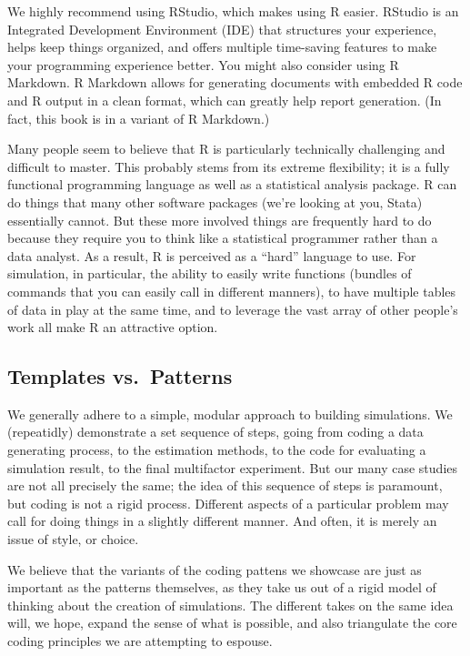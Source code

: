 \documentclass[
]{book}
\begin{document}
We highly recommend using RStudio, which makes using R easier. RStudio is an Integrated Development Environment (IDE) that structures your experience, helps keep things organized, and offers multiple time-saving features to make your programming experience better. You might also consider using R Markdown. R Markdown allows for generating documents with embedded R code and R output in a clean format, which can greatly help report generation.
(In fact, this book is in a variant of R Markdown.)

Many people seem to believe that R is particularly technically challenging and difficult to master. This probably stems from its extreme flexibility; it is a fully functional programming language as well as a statistical analysis package. R can do things that many other software packages (we're looking at you, Stata) essentially cannot.
But these more involved things are frequently hard to do because they require you to think like a statistical programmer rather than a data analyst.
As a result, R is perceived as a ``hard'' language to use.
For simulation, in particular, the ability to easily write functions (bundles of commands that you can easily call in different manners), to have multiple tables of data in play at the same time, and to leverage the vast array of other people's work all make R an attractive option.

\hypertarget{templates-vs.-patterns}{%
\subsection{Templates vs.~Patterns}\label{templates-vs.-patterns}}

We generally adhere to a simple, modular approach to building simulations.
We (repeatidly) demonstrate a set sequence of steps, going from coding a data generating process, to the estimation methods, to the code for evaluating a simulation result, to the final multifactor experiment.
But our many case studies are not all precisely the same; the idea of this sequence of steps is paramount, but coding is not a rigid process.
Different aspects of a particular problem may call for doing things in a slightly different manner.
And often, it is merely an issue of style, or choice.

We believe that the variants of the coding pattens we showcase are just as important as the patterns themselves, as they take us out of a rigid model of thinking about the creation of simulations.
The different takes on the same idea will, we hope, expand the sense of what is possible, and also triangulate the core coding principles we are attempting to espouse.
\end{document}
